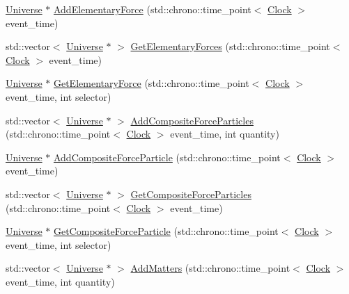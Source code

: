\begin{DoxyCompactItemize}
\item 
\mbox{\hyperlink{class_universe}{Universe}} $\ast$ \mbox{\hyperlink{class_universe_a90c573dec55f2b3ad5680015356f5f25}{Add\+Elementary\+Force}} (std\+::chrono\+::time\+\_\+point$<$ \mbox{\hyperlink{universe_8h_a0ef8d951d1ca5ab3cfaf7ab4c7a6fd80}{Clock}} $>$ event\+\_\+time)
\item 
std\+::vector$<$ \mbox{\hyperlink{class_universe}{Universe}} $\ast$ $>$ \mbox{\hyperlink{class_universe_a6a8ed579b2eedd3aceebda9f3d78aa0e}{Get\+Elementary\+Forces}} (std\+::chrono\+::time\+\_\+point$<$ \mbox{\hyperlink{universe_8h_a0ef8d951d1ca5ab3cfaf7ab4c7a6fd80}{Clock}} $>$ event\+\_\+time)
\item 
\mbox{\hyperlink{class_universe}{Universe}} $\ast$ \mbox{\hyperlink{class_universe_a9506017d944cb64e67567477c1505a53}{Get\+Elementary\+Force}} (std\+::chrono\+::time\+\_\+point$<$ \mbox{\hyperlink{universe_8h_a0ef8d951d1ca5ab3cfaf7ab4c7a6fd80}{Clock}} $>$ event\+\_\+time, int selector)
\item 
std\+::vector$<$ \mbox{\hyperlink{class_universe}{Universe}} $\ast$ $>$ \mbox{\hyperlink{class_universe_a23d74e377203fca7cb74e0ffee7244b6}{Add\+Composite\+Force\+Particles}} (std\+::chrono\+::time\+\_\+point$<$ \mbox{\hyperlink{universe_8h_a0ef8d951d1ca5ab3cfaf7ab4c7a6fd80}{Clock}} $>$ event\+\_\+time, int quantity)
\item 
\mbox{\hyperlink{class_universe}{Universe}} $\ast$ \mbox{\hyperlink{class_universe_ab2671c2218c98f0f1f487c5b3bb96e3c}{Add\+Composite\+Force\+Particle}} (std\+::chrono\+::time\+\_\+point$<$ \mbox{\hyperlink{universe_8h_a0ef8d951d1ca5ab3cfaf7ab4c7a6fd80}{Clock}} $>$ event\+\_\+time)
\item 
std\+::vector$<$ \mbox{\hyperlink{class_universe}{Universe}} $\ast$ $>$ \mbox{\hyperlink{class_universe_aed37d7224b4e31bdfb0632e39bf19694}{Get\+Composite\+Force\+Particles}} (std\+::chrono\+::time\+\_\+point$<$ \mbox{\hyperlink{universe_8h_a0ef8d951d1ca5ab3cfaf7ab4c7a6fd80}{Clock}} $>$ event\+\_\+time)
\item 
\mbox{\hyperlink{class_universe}{Universe}} $\ast$ \mbox{\hyperlink{class_universe_a3e2acc1d75765a6e8e852fca919c5b96}{Get\+Composite\+Force\+Particle}} (std\+::chrono\+::time\+\_\+point$<$ \mbox{\hyperlink{universe_8h_a0ef8d951d1ca5ab3cfaf7ab4c7a6fd80}{Clock}} $>$ event\+\_\+time, int selector)
\item 
std\+::vector$<$ \mbox{\hyperlink{class_universe}{Universe}} $\ast$ $>$ \mbox{\hyperlink{class_universe_ae00d10b2a23c9cedf1ff89e9da875563}{Add\+Matters}} (std\+::chrono\+::time\+\_\+point$<$ \mbox{\hyperlink{universe_8h_a0ef8d951d1ca5ab3cfaf7ab4c7a6fd80}{Clock}} $>$ event\+\_\+time, int quantity)

\end{DoxyCompactItemize}
